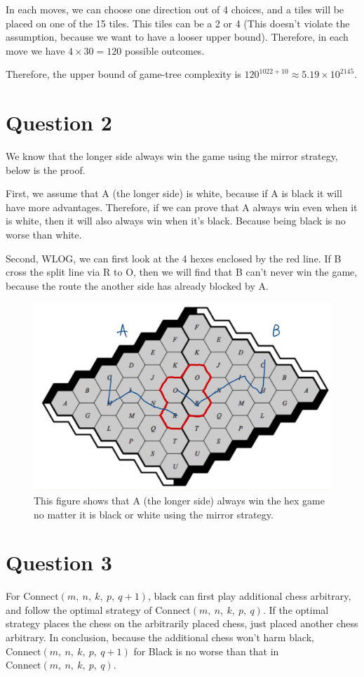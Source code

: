 \documentclass{article}[12pt]
\begin{document}
In each moves, we can choose one direction out of 4 choices, and a tiles will be placed on one of the 15 tiles. This tiles can be a 2 or 4 (This doesn't violate the assumption, because we want to have a looser upper bound). Therefore, in each move we have $4 \times 30 = 120$ possible outcomes.

Therefore, the upper bound of game-tree complexity is $120^{1022+10} \approx 5.19 \times 10^{2145}$.

\section{Question 2}

We know that the longer side always win the game using the mirror strategy, below is the proof.

First, we assume that A (the longer side) is white, because if A is black it will have more advantages. Therefore, if we can prove that A always win even when it is white, then it will also always win when it's black. Because being black is no worse than white.

Second, WLOG, we can first look at the 4 hexes enclosed by the red line. If B cross the split line via R to O, then we will find that B can't never win the game, because the route the another side has already blocked by A. 

\begin{figure}[H]
	\centering
	\includegraphics[width=0.7\linewidth]{hex}
	\caption{This figure shows that A (the longer side) always win the hex game no matter it is black or white using the mirror strategy.}
	\label{fig:hex}
\end{figure}


\section{Question 3}

For $\text{Connect}(m,\ n,\ k,\ p,\ q+1)$, black can first play additional chess arbitrary, and follow the optimal strategy of $\text{Connect}(m,\ n,\ k,\ p,\ q)$. If the optimal strategy places the chess on the arbitrarily placed chess, just placed another chess arbitrary. In conclusion, because the additional chess won't harm black, $\text{Connect}(m,\ n,\ k,\ p,\ q+1)$ for Black is no worse than that in $\text{Connect}(m,\ n,\ k,\ p,\ q)$.
\end{document}
